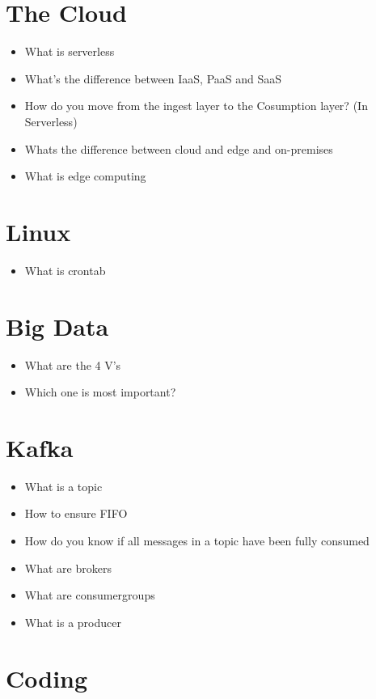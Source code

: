 \documentclass[12pt, numbers=noenddot]{scrreprt} %
\begin{document}
\section*{The Cloud}

\begin{itemize}
\item What is serverless
\item What's the difference between IaaS, PaaS and SaaS
\item How do you move from the ingest layer to the Cosumption layer? (In Serverless)
\item Whats the difference between cloud and edge and on-premises
\item What is edge computing
\end{itemize}

\section*{Linux}

\begin{itemize}
\item What is crontab
\end{itemize}

\section*{Big Data}

\begin{itemize}
\item What are the 4 V's
\item Which one is most important?
\end{itemize}

\section*{Kafka}

\begin{itemize}
\item What is a topic
\item How to ensure FIFO
\item How do you know if all messages in a topic have been fully consumed
\item What are brokers
\item What are consumergroups
\item What is a producer
\end{itemize}

\section*{Coding}
\end{document}
